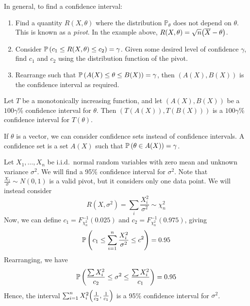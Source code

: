 \begin{remark}
	In general, to find a confidence interval:
	\begin{enumerate}
		\item Find a quantity \( R(X,\theta) \) where the distribution \( \mathbb P_\theta \) does not depend on \( \theta \).
			This is known as a \textit{pivot}.
			In the example above, \( R(X,\theta) = \sqrt{n}\qty(\overline X - \theta) \).
		\item Consider \( \mathbb{P}\left({c_1 \leq R(X,\theta) \leq c_2}\right) = \gamma \).
			Given some desired level of confidence \( \gamma \), find \( c_1 \) and \( c_2 \) using the distribution function of the pivot.
		\item Rearrange such that \( \mathbb{P}\left({A(X) \leq \theta \leq B(X)}\right) = \gamma \), then \( (A(X), B(X)) \) is the confidence interval as required.
	\end{enumerate}
\end{remark}
\begin{proposition}
	Let \( T \) be a monotonically increasing function, and let \( (A(X), B(X)) \) be a \( 100 \gamma \)\% confidence interval for \( \theta \).
	Then \( (T(A(X)), T(B(X))) \) is a \( 100 \gamma \)\% confidence interval for \( T(\theta) \).
\end{proposition}
\begin{remark}
	If \( \theta \) is a vector, we can consider confidence sets instead of confidence intervals.
	A confidence set is a set \( A(X) \) such that \( \mathbb{P}\left({\theta \in A(X)}\right) = \gamma \).
\end{remark}
\begin{example}
	Let \( X_1, \dots, X_n \) be i.i.d.\ normal random variables with zero mean and unknown variance \( \sigma^2 \).
	We will find a 95\% confidence interval for \( \sigma^2 \).
	Note that \( \frac{X_1}{\sigma} \sim N(0,1) \) is a valid pivot, but it considers only one data point.
	We will instead consider
	\[ R(X, \sigma^2) = \sum_i \frac{X_i^2}{\sigma^2} \sim \chi^2_n \]
	Now, we can define \( c_1 = F_{\chi^2_n}^{-1}(0.025) \) and \( c_2 = F_{\chi^2_n}^{-1}(0.975) \), giving
	\[ \mathbb{P}\left({c_1 \leq \sum_{i=1}^n \frac{X_i^2}{\sigma^2} \leq c^2}\right) = 0.95 \]
	Rearranging, we have
	\[ \mathbb{P}\left({\frac{\sum X_i^2}{c_2} \leq \sigma^2 \leq \frac{\sum X_i^2}{c_1}}\right) = 0.95 \]
	Hence, the interval \( \sum_{i=1}^n X_i^2 \qty(\frac{1}{c_2}, \frac{1}{c_1}) \) is a 95\% confidence interval for \( \sigma^2 \).
\end{example}
